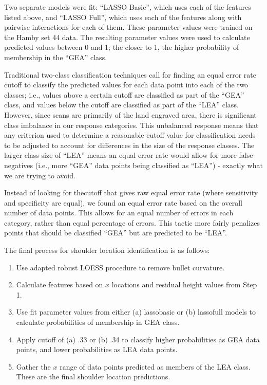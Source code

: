 \documentclass[12pt]{article}
\begin{document}
Two separate models were fit: ``LASSO Basic'', which uses each of the
features listed above, and ``LASSO Full'', which uses each of the
features along with pairwise interactions for each of them. These
parameter values were trained on the Hamby set 44 data. The resulting
parameter values were used to calculate predicted values between 0 and
1; the closer to 1, the higher probability of membership in the ``GEA''
class.

 Traditional two-class
classification techniques call for finding an equal error rate cutoff to
classify the predicted values for each data point into each of the two
classes; i.e., values above a certain cutoff are classified as part of
the ``GEA'' class, and values below the cutoff are classified as part of
the ``LEA'' class. However, since scans are primarily of the land
engraved area, there is significant class imbalance in our response
categories. This unbalanced response means that any criterion used to
determine a reasonable cutoff value for classification needs to be
adjusted to account for differences in the size of the response classes.
The larger class size of ``LEA'' means an equal error rate would allow
for more false negatives (i.e., more ``GEA'' data points being
classified as ``LEA'') - exactly what we are trying to avoid.

 Instead of looking for thecutoff that gives raw equal error
rate (where sensitivity and specificity are equal), we found an equal
error rate based on the overall number of data points. This allows for
an equal number of errors in each category, rather than equal percentage
of errors. This tactic more fairly penalizes points that should be
classified ``GEA'' but are predicted to be ``LEA''.

The final process for shoulder location identification is as follows:

\begin{enumerate}
\item Use adapted robust LOESS procedure to remove bullet curvature.
\item Calculate features based on $x$ locations and residual height values from Step 1. 
\item Use fit parameter values from either (a) lassobasic or (b) lassofull models to calculate probabilities of membership in GEA class.
\item Apply cutoff of (a) .33 or (b) .34 to classify higher probabilities as GEA data points, and lower probabilities as LEA data points.
\item Gather the $x$ range of data points predicted as members of the LEA class. These are the final shoulder location predictions.   
\end{enumerate}
\end{document}
